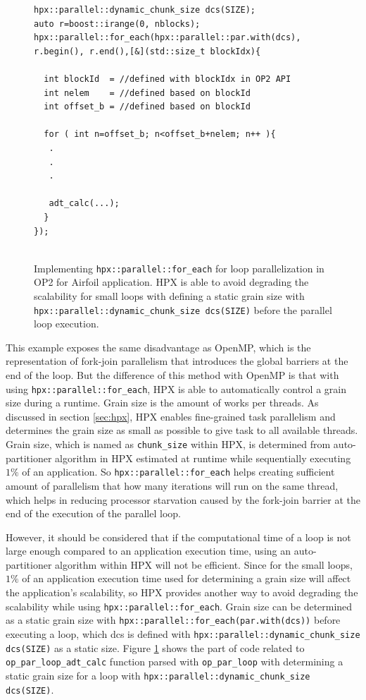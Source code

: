 \documentclass[conference]{IEEEtran}
\begin{document}
\begin{figure} 
    \begin{lstlisting}    
hpx::parallel::dynamic_chunk_size dcs(SIZE);
auto r=boost::irange(0, nblocks);
hpx::parallel::for_each(hpx::parallel::par.with(dcs), r.begin(), r.end(),[&](std::size_t blockIdx){
  
  int blockId  = //defined with blockIdx in OP2 API
  int nelem    = //defined based on blockId 
  int offset_b = //defined based on blockId
        
  for ( int n=offset_b; n<offset_b+nelem; n++ ){
   .
   .
   .

   adt_calc(...);
  }
});
  
    \end{lstlisting}
    \caption{\small{Implementing \texttt{hpx::parallel::for\_each} for loop parallelization in OP2 for Airfoil application. HPX is able to avoid degrading the scalability for small loops with defining a static grain size with \texttt{hpx::parallel::dynamic\_chunk\_size dcs(SIZE)} before the parallel loop execution.}}
    \label{l3b}
\end{figure}



This example exposes the same disadvantage as OpenMP, which is the representation of fork-join parallelism that introduces the global barriers at the end of the loop. But the difference of this method with OpenMP is that with using \texttt{hpx::parallel::for\_each}, HPX is able to automatically control a grain size during a runtime. Grain size is the amount of works per threads. As discussed in section \ref{sec:hpx}, HPX enables fine-grained task parallelism and determines the grain size as small as possible to give task to all available threads. Grain size, which is named as \texttt{chunk\_size} within HPX, is determined from auto-partitioner algorithm in HPX estimated at runtime while sequentially executing $1\%$ of an application. So \texttt{hpx::parallel::for\_each} helps creating sufficient amount of parallelism that how many iterations will run on the same thread, which helps in reducing processor starvation caused by the fork-join barrier at the end of the execution of the parallel loop. 

However, it should be considered that if the computational time of a loop is not large enough compared to an application execution time, using an auto-partitioner algorithm within HPX will not be efficient. Since for the small loops, $1\%$ of an application execution time used for determining a grain size will affect the application's scalability, so HPX provides another way to avoid degrading the scalability while using \texttt{hpx::parallel::for\_each}. Grain size can be determined as a static grain size with \texttt{hpx::parallel::for\_each(par.with(dcs))} before executing a loop, which dcs is defined with \texttt{hpx::parallel::dynamic\_chunk\_size dcs(SIZE)} as a static size.  Figure \ref{l3b} shows the part of code related to \texttt{op\_par\_loop\_adt\_calc} function parsed with \texttt{op\_par\_loop} with determining a static grain size for a loop with \texttt{hpx::parallel::dynamic\_chunk\_size dcs(SIZE)}. 
\end{document}

